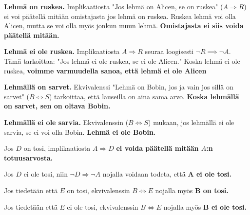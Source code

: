 \documentclass[12pt,a4paper]{article}
\begin{document}
\begin{kohta}
  \item %
    \begin{alakohta}
      \item \textbf{Lehmä on ruskea.} Implikaatiosta "Jos lehmä on Alicen, 
      se on ruskea" ($A \Rightarrow R$) ei voi päätellä mitään omistajasta 
      jos lehmä on ruskea. Ruskea lehmä voi olla Alicen, mutta se voi olla 
      myös jonkun muun lehmä. 
      \textbf{Omistajasta ei siis voida päätellä mitään.}

      \item \textbf{Lehmä ei ole ruskea.} Implikaatiosta $A \Rightarrow R$ 
      seuraa loogisesti $\neg R \implies \neg A$. Tämä 
      tarkoittaa: "Jos lehmä ei ole ruskea, se ei ole Alicen." Koska 
      lehmä ei ole ruskea,
      \textbf{voimme varmuudella sanoa, että lehmä ei ole Alicen}

      \item \textbf{Lehmällä on sarvet.} Ekvivalenssi "Lehmä on Bobin, jos
      ja vain jos sillä on sarvet" ($B \iff S$) tarkoittaa, että lauseilla
      on aina sama arvo.
      \textbf{Koska lehmällä on sarvet, sen on oltava Bobin.}

      \item \textbf{Lehmällä ei ole sarvia.} Ekvivalenssin ($B \iff S$)
      mukaan, jos lehmällä ei ole sarvia, se ei voi olla Bobin.
      \textbf{Lehmä ei ole Bobin.}
    \end{alakohta}

  \item %
    \begin{alakohta}
      \item Jos $D$ on tosi, implikaatiosta $A \Rightarrow D$ 
      \textbf{ei voida päätellä mitään $A$:n totuusarvosta.}

      \item Jos $D$ ei ole tosi, niin $\neg D \Rightarrow \neg A$ nojalla 
      voidaan todeta, että \textbf{A ei ole tosi.}

      \item Jos tiedetään että $E$ on tosi, ekvivalenssin $B \iff E$ nojalla myös
      \textbf{B on tosi.}

      \item Jos tiedetään että $E$ ei ole tosi, ekvivalenssin $B \iff E$ nojalla myös
      \textbf{B ei ole tosi.}
    \end{alakohta}
\end{kohta}
\end{document}
